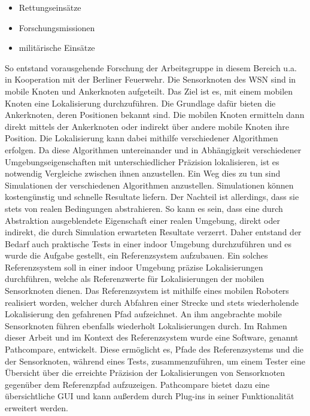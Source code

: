 \begin{itemize}
  \item Rettungseinsätze 
  \item Forschungsmissionen
  \item militärische Einsätze
\end{itemize}

So entstand vorausgehende Forschung der Arbeitsgruppe in diesem Bereich u.a. in
Kooperation mit der Berliner Feuerwehr. Die Sensorknoten des WSN sind in mobile
Knoten und Ankerknoten aufgeteilt. Das Ziel ist es, mit einem mobilen Knoten
eine Lokalisierung durchzuführen. Die Grundlage dafür bieten die Ankerknoten,
deren Positionen bekannt sind. Die mobilen Knoten ermitteln dann direkt mittels
der Ankerknoten oder indirekt über andere mobile Knoten ihre Position. Die
Lokalisierung kann dabei mithilfe verschiedener Algorithmen erfolgen. Da diese
Algorithmen untereinander und in Abhängigkeit verschiedener
Umgebungseigenschaften mit unterschiedlicher Präzision lokalisieren, ist es
notwendig Vergleiche zwischen ihnen anzustellen. Ein Weg dies zu tun sind
Simulationen der verschiedenen Algorithmen anzustellen. Simulationen können
kostengünstig und schnelle Resultate liefern. Der Nachteil ist allerdings, dass
sie stets von realen Bedingungen abstrahieren. So kann es sein, dass eine durch
Abstraktion ausgeblendete Eigenschaft einer realen Umgebung, direkt oder
indirekt, die durch Simulation erwarteten Resultate verzerrt. Daher entstand
der Bedarf auch praktische Tests in einer indoor Umgebung durchzuführen und es
wurde die Aufgabe gestellt, ein Referenzsystem aufzubauen. Ein solches
Referenzsystem soll in einer indoor Umgebung präzise Lokalisierungen
durchführen, welche als Referenzwerte für Lokalisierungen der mobilen
Sensorknoten dienen. Das Referenzsystem ist mithilfe eines mobilen Roboters
realisiert worden, welcher durch Abfahren einer Strecke und stets wiederholende
Lokalisierung den gefahrenen Pfad aufzeichnet.  An ihm angebrachte mobile
Sensorknoten führen ebenfalls wiederholt Lokalisierungen durch. Im Rahmen
dieser Arbeit und im Kontext des Referenzsystem wurde eine Software, genannt 
Pathcompare, entwickelt.  Diese ermöglicht es, Pfade des Referenzsystems und
die der Sensorknoten, während eines Tests, zusammenzuführen, um einem Tester
eine Übersicht über die erreichte Präzision der Lokalisierungen von
Sensorknoten gegenüber dem Referenzpfad aufzuzeigen. Pathcompare bietet dazu
eine übersichtliche GUI und kann außerdem durch Plug-ins in seiner Funktionalität
erweitert werden.

